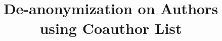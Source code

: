 \documentclass{sigkddExp}
\begin{document}
%

\title{De-anonymization on Authors using Coauthor List}
%

%

\end{document}
